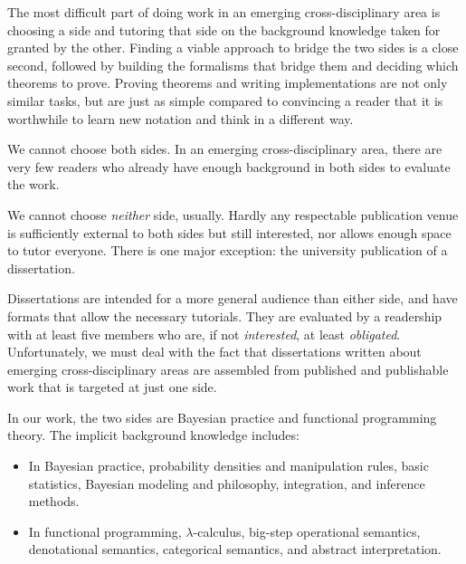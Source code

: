 The most difficult part of doing work in an emerging cross-disciplinary area is choosing a side and tutoring that side on the background knowledge taken for granted by the other.
Finding a viable approach to bridge the two sides is a close second, followed by building the formalisms that bridge them and deciding which theorems to prove.
Proving theorems and writing implementations are not only similar tasks, but are just as simple compared to convincing a reader that it is worthwhile to learn new notation and think in a different way.

We cannot choose both sides.
In an emerging cross-disciplinary area, there are very few readers who already have enough background in both sides to evaluate the work.

We cannot choose \emph{neither} side, usually.
Hardly any respectable publication venue is sufficiently external to both sides but still interested, nor allows enough space to tutor everyone.
There is one major exception: the university publication of a dissertation.

Dissertations are intended for a more general audience than either side, and have formats that allow the necessary tutorials.
They are evaluated by a readership with at least five members who are, if not \emph{interested}, at least \emph{obligated}.
Unfortunately, we must deal with the fact that dissertations written about emerging cross-disciplinary areas are assembled from published and publishable work that is targeted at just one side.

In our work, the two sides are Bayesian practice and functional programming theory.
The implicit background knowledge includes:
\begin{itemize}
	\item In Bayesian practice, probability densities and manipulation rules, basic statistics, Bayesian modeling and philosophy, integration, and inference methods.
	\item In functional programming, $\lambda$-calculus, big-step operational semantics, denotational semantics, categorical semantics, and abstract interpretation.
\end{itemize}

